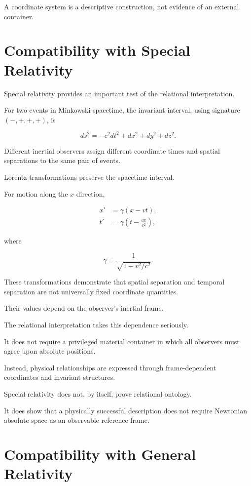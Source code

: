 \documentclass[12pt,onecolumn]{article}
\begin{document}
A coordinate system is a descriptive
construction, not evidence of an external
container.

\section{Compatibility with Special Relativity}

Special relativity provides an important
test of the relational interpretation.

For two events in Minkowski spacetime,
the invariant interval, using signature
$(-,+,+,+)$, is

\begin{equation}
ds^2
=
-c^2dt^2+dx^2+dy^2+dz^2.
\end{equation}

Different inertial observers assign different
coordinate times and spatial separations
to the same pair of events.

Lorentz transformations preserve the
spacetime interval.

For motion along the $x$ direction,

\begin{align}
x' &= \gamma(x-vt),\\
t' &= \gamma
\left(t-\frac{vx}{c^2}\right),
\end{align}

where

\begin{equation}
\gamma
=
\frac{1}{\sqrt{1-v^2/c^2}}.
\end{equation}

These transformations demonstrate that
spatial separation and temporal separation
are not universally fixed coordinate
quantities.

Their values depend on the observer's
inertial frame.

The relational interpretation takes this
dependence seriously.

It does not require a privileged material
container in which all observers must
agree upon absolute positions.

Instead, physical relationships are
expressed through frame-dependent
coordinates and invariant structures.

Special relativity does not, by itself,
prove relational ontology.

It does show that a physically successful
description does not require Newtonian
absolute space as an observable reference
frame.

\section{Compatibility with General Relativity}
\end{document}
